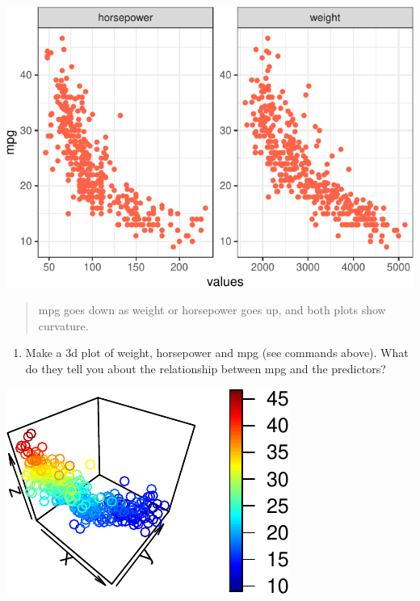 \documentclass[]{article}
\newenvironment{Shaded}{\begin{snugshade}}{\end{snugshade}}
\newcommand{\KeywordTok}[1]{\textcolor[rgb]{0.13,0.29,0.53}{\textbf{#1}}}
\newcommand{\NormalTok}[1]{#1}
\newcommand{\OperatorTok}[1]{\textcolor[rgb]{0.81,0.36,0.00}{\textbf{#1}}}
\providecommand{\tightlist}{%
  \setlength{\itemsep}{0pt}\setlength{\parskip}{0pt}}
\begin{document}
\begin{center}\includegraphics{sol_A2_files/figure-latex/unnamed-chunk-16-1} \end{center}

\begin{quote}
mpg goes down as weight or horsepower goes up, and both plots show
curvature.
\end{quote}

\begin{enumerate}
\def\labelenumi{(\alph{enumi})}
\setcounter{enumi}{1}
\tightlist
\item
  Make a 3d plot of weight, horsepower and mpg (see commands above).
  What do they tell you about the relationship between mpg and the
  predictors?
\end{enumerate}

\begin{Shaded}
\end{Shaded}

\begin{center}\includegraphics{sol_A2_files/figure-latex/unnamed-chunk-17-1} \end{center}
\end{document}
